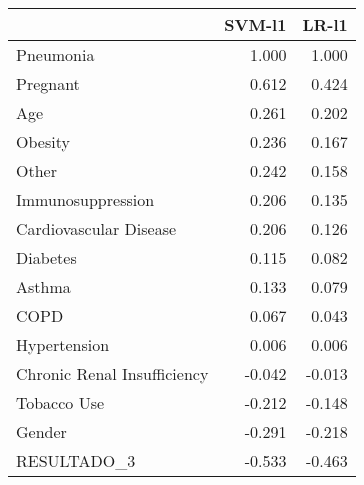\begin{tabular}{lrr}
\toprule
{} &  SVM-l1 &  LR-l1 \\
\midrule
Pneumonia                   &   1.000 &  1.000 \\
Pregnant                    &   0.612 &  0.424 \\
Age                         &   0.261 &  0.202 \\
Obesity                     &   0.236 &  0.167 \\
Other                       &   0.242 &  0.158 \\
Immunosuppression           &   0.206 &  0.135 \\
Cardiovascular Disease      &   0.206 &  0.126 \\
Diabetes                    &   0.115 &  0.082 \\
Asthma                      &   0.133 &  0.079 \\
COPD                        &   0.067 &  0.043 \\
Hypertension                &   0.006 &  0.006 \\
Chronic Renal Insufficiency &  -0.042 & -0.013 \\
Tobacco Use                 &  -0.212 & -0.148 \\
Gender                      &  -0.291 & -0.218 \\
RESULTADO\_3                 &  -0.533 & -0.463 \\
\bottomrule
\end{tabular}
